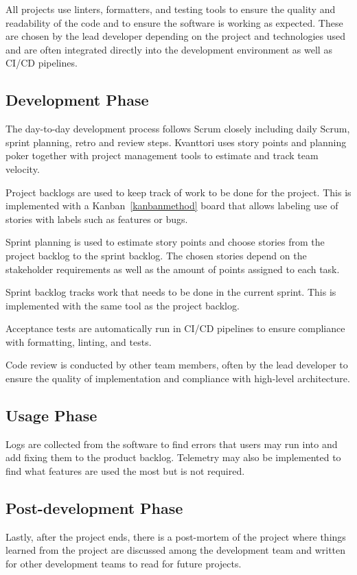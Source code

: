 All projects use linters, formatters, and testing tools to ensure the quality and readability of the code and to ensure the software is working as expected. These are chosen by the lead developer depending on the project and technologies used and are often integrated directly into the development environment as well as CI/CD pipelines.

\subsection{Development Phase}
The day-to-day development process follows Scrum closely including daily Scrum, sprint planning, retro and review steps. Kvanttori uses story points and planning poker together with project management tools to estimate and track team velocity.

Project backlogs are used to keep track of work to be done for the project. This is implemented with a Kanban~\ref{kanbanmethod} board that allows labeling use of stories with labels such as features or bugs.

Sprint planning is used to estimate story points and choose stories from the project backlog to the sprint backlog. The chosen stories depend on the stakeholder requirements as well as the amount of points assigned to each task.

Sprint backlog tracks work that needs to be done in the current sprint. This is implemented with the same tool as the project backlog.

Acceptance tests are automatically run in CI/CD pipelines to ensure compliance with formatting, linting, and tests.

Code review is conducted by other team members, often by the lead developer to ensure the quality of implementation and compliance with high-level architecture.

\subsection{Usage Phase}
Logs are collected from the software to find errors that users may run into and add fixing them to the product backlog. Telemetry may also be implemented to find what features are used the most but is not required.

\subsection{Post-development Phase}
Lastly, after the project ends, there is a post-mortem of the project where things learned from the project are discussed among the development team and written for other development teams to read for future projects.

